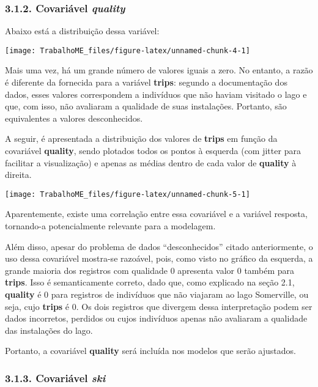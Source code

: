 \documentclass[
]{article}
\begin{document}
\subsubsection{\texorpdfstring{3.1.2. Covariável
\emph{quality}}{3.1.2. Covariável quality}}\label{covariuxe1vel-quality}

Abaixo está a distribuição dessa variável:

\begin{center}\texttt{[image: TrabalhoME\_files/figure-latex/unnamed-chunk-4-1]} \end{center}

Mais uma vez, há um grande número de valores iguais a zero. No entanto,
a razão é diferente da fornecida para a variável \textbf{trips}: segundo
a documentação dos dados, esses valores correspondem a indivíduos que
não haviam visitado o lago e que, com isso, não avaliaram a qualidade de
suas instalações. Portanto, são equivalentes a valores desconhecidos.

A seguir, é apresentada a distribuição dos valores de \textbf{trips} em
função da covariável \textbf{quality}, sendo plotados todos os pontos à
esquerda (com jitter para facilitar a visualização) e apenas as médias
dentro de cada valor de \textbf{quality} à direita.

\begin{center}\texttt{[image: TrabalhoME\_files/figure-latex/unnamed-chunk-5-1]} \end{center}

Aparentemente, existe uma correlação entre essa covariável e a variável
resposta, tornando-a potencialmente relevante para a modelagem.

Além disso, apesar do problema de dados ``desconhecidos'' citado
anteriormente, o uso dessa covariável mostra-se razoável, pois, como
visto no gráfico da esquerda, a grande maioria dos registros com
qualidade \(0\) apresenta valor \(0\) também para \textbf{trips}. Isso é
semanticamente correto, dado que, como explicado na seção 2.1,
\textbf{quality} é \(0\) para registros de indivíduos que não viajaram
ao lago Somerville, ou seja, cujo \textbf{trips} é \(0\). Os dois
registros que divergem dessa interpretação podem ser dados incorretos,
perdidos ou cujos indivíduos apenas não avaliaram a qualidade das
instalações do lago.

Portanto, a covariável \textbf{quality} será incluída nos modelos que
serão ajustados.

\subsubsection{\texorpdfstring{3.1.3. Covariável
\emph{ski}}{3.1.3. Covariável ski}}\label{covariuxe1vel-ski}
\end{document}
